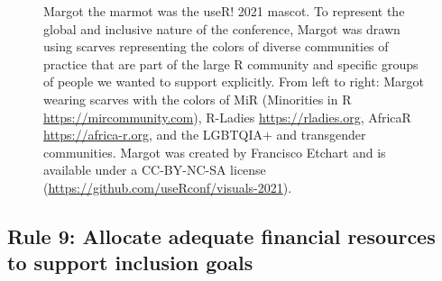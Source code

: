 \documentclass[10pt,letterpaper]{article}
\begin{document}
\begin{figure}[!h]
\centering
{}
\caption{Margot the marmot was the useR! 2021 mascot. To represent the global and inclusive nature of the conference, Margot was drawn using scarves representing the colors of diverse communities of practice that are part of the large R community and specific groups of people we wanted to support explicitly. From left to right: Margot wearing scarves with the colors of MiR (Minorities in R \url{https://mircommunity.com}), R-Ladies \url{https://rladies.org}, AfricaR \url{https://africa-r.org}, and the LGBTQIA+ and transgender communities. Margot was created by Francisco Etchart and is available under a CC-BY-NC-SA license (\url{https://github.com/useRconf/visuals-2021}).}
\label{fig:marmots}
\end{figure}

\subsection*{Rule 9: Allocate adequate financial resources to support inclusion goals}
\label{rule_financial}
\end{document}
